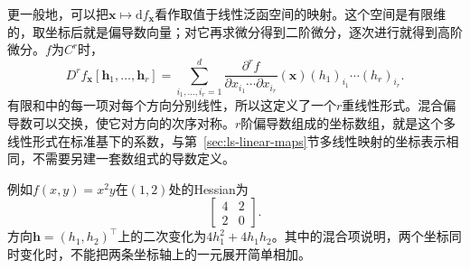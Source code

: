 更一般地，可以把$\bm x\mapsto\mathrm df_{\bm x}$看作取值于线性泛函空间的映射。这个空间是有限维的，取坐标后就是偏导数向量；对它再求微分得到二阶微分，逐次进行就得到高阶微分。$f$为$C^r$时，
\[
 D^rf_{\bm x}[\bm h_1,\ldots,\bm h_r]
 =\sum_{i_1,\ldots,i_r=1}^d
 \frac{\partial^rf}{\partial x_{i_1}\cdots\partial x_{i_r}}(\bm x)
 (h_1)_{i_1}\cdots(h_r)_{i_r}.
\]
有限和中的每一项对每个方向分别线性，所以这定义了一个$r$重线性形式。混合偏导数可以交换，使它对方向的次序对称。$r$阶偏导数组成的坐标数组，就是这个多线性形式在标准基下的系数，与第~\ref{sec:ls-linear-maps}节多线性映射的坐标表示相同，不需要另建一套数组式的导数定义。

例如$f(x,y)=x^2y$在$(1,2)$处的Hessian为
\[
 \begin{bmatrix}4&2\\2&0\end{bmatrix}.
\]
方向$\bm h=(h_1,h_2)^\top$上的二次变化为$4h_1^2+4h_1h_2$。其中的混合项说明，两个坐标同时变化时，不能把两条坐标轴上的一元展开简单相加。

